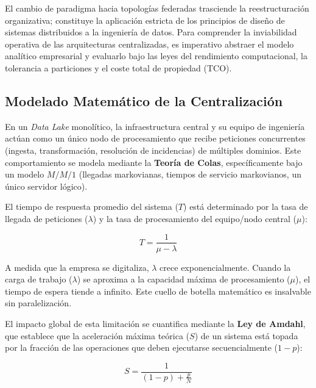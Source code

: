 \documentclass[12pt, a4paper]{article}
\begin{document}
El cambio de paradigma hacia topologías federadas trasciende la reestructuración organizativa; constituye la aplicación estricta de los principios de diseño de sistemas distribuidos a la ingeniería de datos. Para comprender la inviabilidad operativa de las arquitecturas centralizadas, es imperativo abstraer el modelo analítico empresarial y evaluarlo bajo las leyes del rendimiento computacional, la tolerancia a particiones y el coste total de propiedad (TCO).

\subsection{Modelado Matemático de la Centralización}

En un \textit{Data Lake} monolítico, la infraestructura central y su equipo de ingeniería actúan como un único nodo de procesamiento que recibe peticiones concurrentes (ingesta, transformación, resolución de incidencias) de múltiples dominios. Este comportamiento se modela mediante la \textbf{Teoría de Colas}, específicamente bajo un modelo $M/M/1$ (llegadas markovianas, tiempos de servicio markovianos, un único servidor lógico).

El tiempo de respuesta promedio del sistema ($T$) está determinado por la tasa de llegada de peticiones ($\lambda$) y la tasa de procesamiento del equipo/nodo central ($\mu$):

\begin{equation}
    T = \frac{1}{\mu - \lambda}
\end{equation}

A medida que la empresa se digitaliza, $\lambda$ crece exponencialmente. Cuando la carga de trabajo ($\lambda$) se aproxima a la capacidad máxima de procesamiento ($\mu$), el tiempo de espera tiende a infinito. Este cuello de botella matemático es insalvable sin paralelización.

El impacto global de esta limitación se cuantifica mediante la \textbf{Ley de Amdahl}, que establece que la aceleración máxima teórica ($S$) de un sistema está topada por la fracción de las operaciones que deben ejecutarse secuencialmente ($1 - p$):

\begin{equation}
    S = \frac{1}{(1 - p) + \frac{p}{N}}
\end{equation}
\end{document}
